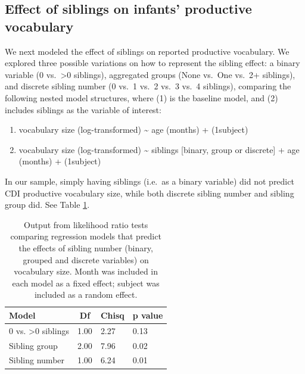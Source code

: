 \documentclass[
  english,
  man,floatsintext]{apa6}
\providecommand{\tightlist}{%
  \setlength{\itemsep}{0pt}\setlength{\parskip}{0pt}}
\begin{document}
\hypertarget{effect-of-siblings-on-infants-productive-vocabulary}{%
\subsection{Effect of siblings on infants' productive vocabulary}\label{effect-of-siblings-on-infants-productive-vocabulary}}

We next modeled the effect of siblings on reported productive vocabulary. We explored three possible variations on how to represent the sibling effect: a binary variable (0 vs.~\textgreater0 siblings), aggregated groups (None vs.~One vs.~2+ siblings), and discrete sibling number (0 vs.~1 vs.~2 vs.~3 vs.~4 siblings), comparing the following nested model structures, where (1) is the baseline model, and (2) includes siblings as the variable of interest:

\begin{enumerate}
\def\labelenumi{\arabic{enumi}.}
\tightlist
\item
  vocabulary size (log-transformed) \textasciitilde{} age (months) + (1\textbar subject)
\item
  vocabulary size (log-transformed) \textasciitilde{} siblings {[}binary, group or discrete{]} + age (months) + (1\textbar subject)
\end{enumerate}

In our sample, simply having siblings (i.e.~as a binary variable) did not predict CDI productive vocabulary size, while both discrete sibling number and sibling group did. See Table \ref{tab:table-sibling-model-output}.

\begin{table}[H]

\begin{center}
\begin{threeparttable}

\caption{\label{tab:table-sibling-model-output}Output from likelihood ratio tests comparing regression models that predict the effects of sibling number (binary, grouped and discrete variables) on vocabulary size. Month was included in each model as a fixed effect; subject was included as a random effect.}

\small{

\begin{tabular}{llll}
\toprule
Model & \multicolumn{1}{c}{Df} & \multicolumn{1}{c}{Chisq} & \multicolumn{1}{c}{p value}\\
\midrule
0 vs. >0 siblings & 1.00 & 2.27 & 0.13\\
Sibling group & 2.00 & 7.96 & 0.02\\
Sibling number & 1.00 & 6.24 & 0.01\\
\bottomrule
\end{tabular}

}

\end{threeparttable}
\end{center}

\end{table}
\end{document}
